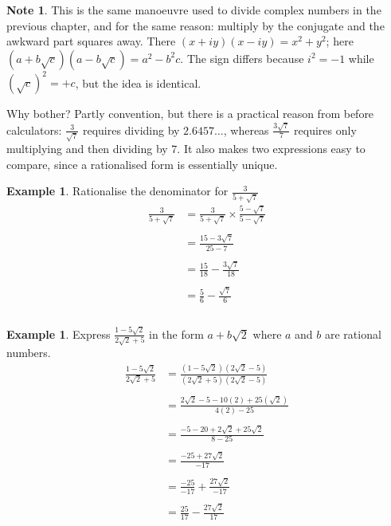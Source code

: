 \documentclass[11pt,a4paper]{article}
\theoremstyle{definition}
\newtheorem{example}[thm]{Example}
\newtheorem{note}[thm]{Note}
\begin{document}
\begin{note}
This is the same manoeuvre used to divide complex numbers in the previous chapter,
and for the same reason: multiply by the conjugate and the awkward part squares
away. There $\left(x+iy\right)\left(x-iy\right)=x^{2}+y^{2}$; here
$\left(a+b\sqrt{c}\right)\left(a-b\sqrt{c}\right)=a^{2}-b^{2}c$. The sign differs
because $i^{2}=-1$ while $\left(\sqrt{c}\right)^{2}=+c$, but the idea is identical.

Why bother? Partly convention, but there is a practical reason from before
calculators: $\frac{3}{\sqrt{7}}$ requires dividing by $2.6457\ldots$, whereas
$\frac{3\sqrt{7}}{7}$ requires only multiplying and then dividing by $7$. It also
makes two expressions easy to compare, since a rationalised form is essentially
unique.
\end{note}
\begin{example}

Rationalise the denominator for $\frac{3}{5+\sqrt{7}}$\\
\begin{align*}
\frac{3}{5+\sqrt{7}} & =\frac{3}{5+\sqrt{7}}\times \frac{5-\sqrt{7}}{5-\sqrt{7}}\\\\
& = \frac{15-3\sqrt{7}}{25-7}\\\\
& =\frac{15}{18}-\frac{3\sqrt{7}}{18}\\\\
& = \frac{5}{6}-\frac{\sqrt{7}}{6}\\\\
\end{align*}
\end{example}
\begin{example}

Express $\frac{1-5\sqrt{2}}{2\sqrt{2}+5}$ in the form $a+b\sqrt{2}$ where $a$ and $b$ are rational numbers.\\
\begin{align*}
\frac{1-5\sqrt{2}}{2\sqrt{2}+5} & =\frac{(1-5\sqrt{2})(2\sqrt{2}-5)}{(2\sqrt{2}+5)(2\sqrt{2}-5)}\\\\
&=\frac{2\sqrt{2}-5-10(2)+25(\sqrt{2})}{4(2)-25}\\\\
&=\frac{-5-20+2\sqrt{2}+25\sqrt{2}}{8-25}\\\\
&=\frac{-25+27\sqrt{2}}{-17}\\\\
& =\frac{-25}{-17}+\frac{27\sqrt{2}}{-17}\\\\
& =\frac{25}{17}-\frac{27\sqrt{2}}{17}\\\\
\end{align*}
\end{example}
\pagebreak
\end{document}
